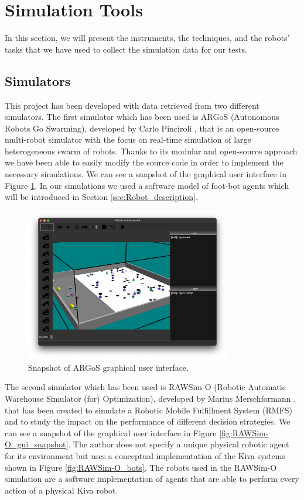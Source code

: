 \documentclass[../../Thesis.tex]{subfiles}
\begin{document}
	
	\section{Simulation Tools}
			
		In this section, we will present the instruments, the techniques, and the robots' tasks that we have used to collect the simulation data for our tests.
		
		\subsection{Simulators}
		\label{sec:simulators}
			This project has been developed with data retrieved from two different simulators. The first simulator which has been used is ARGoS (Autonomous Robots Go Swarming), developed by Carlo Pinciroli \cite{Pinciroli:SI2012}, that is an open-source multi-robot simulator with the focus on real-time simulation of large heterogeneous swarm of robots. Thanks to its modular and open-source approach we have been able to easily modify the source code in order to implement the necessary simulations.  We can see a snapshot of the graphical user interface in Figure \ref{fig:ARGoS_gui_snapshot}.  In our simulations we used a software model of foot-bot agents which will be introduced in Section \ref{sec:Robot_description}.\\
			\begin{figure}
			    \centering
			    \includegraphics[width=0.8\textwidth]{../../Images/Data_collection/argos_gui_snapshot.png}
			    \caption{Snapshot of ARGoS graphical user interface.}
			    \label{fig:ARGoS_gui_snapshot}
			\end{figure}
			The second simulator which has been used is RAWSim-O (Robotic Automatic Warehouse Simulator (for) Optimization), developed by Marius Merschformann \cite{Merschformann2018}, that has been created to simulate a Robotic Mobile Fulfillment System (RMFS) and to study the impact on the performance of different decision strategies. We can see a snapshot of the graphical user interface in Figure \ref{fig:RAWSim-O_gui_snapshot}. The author does not specify a unique physical robotic agent for its environment but uses a conceptual implementation of the Kiva systems shown in Figure \ref{fig:RAWSim-O_bots}. The robots used in the RAWSim-O simulation are a software implementation of agents that are able to perform every action of a physical Kiva robot.
\end{document}
